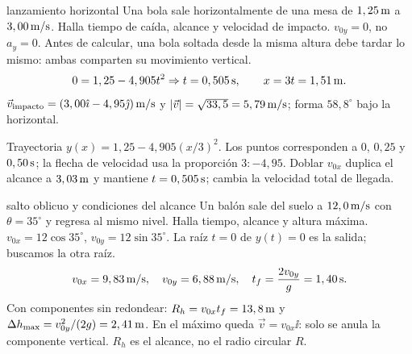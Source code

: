 \documentclass[11pt,a4paper]{article}
\begin{document}
\begin{examplebox}{lanzamiento horizontal}
 Una bola sale horizontalmente de una mesa de
$1,25\,\mathrm{m}$ a $3,00\,\mathrm{m/s}$. Halla tiempo de ca\'ida, alcance y velocidad de impacto.
\solutionblock
{} $v_{0y}=0$, no $a_y=0$. Antes de calcular, una bola soltada desde
la misma altura debe tardar lo mismo: ambas comparten su movimiento vertical.
\[
0=1,25-4,905t^2\Rightarrow t=0,505\,\mathrm{s},\qquad
x=3t=1,51\,\mathrm{m}.
\]
$\vec v_{\mathrm{impacto}}=(3,00\hat{\imath}-4,95\hat{\jmath})\,\mathrm{m/s}$ y
$|\vec v|=\sqrt{33,5}=5,79\,\mathrm{m/s}$; forma $58,8^\circ$ bajo la horizontal.
\begin{center}
\end{center}
Trayectoria $y(x)=1,25-4,905(x/3)^2$. Los puntos corresponden a $0$, $0,25$ y
$0,50\,\mathrm{s}$; la flecha de velocidad usa la proporci\'on $3:-4,95$.
 Doblar $v_{0x}$ duplica el alcance a $3,03\,\mathrm{m}$
y mantiene $t=0,505\,\mathrm{s}$; cambia la velocidad total de llegada.
\end{examplebox}

\begin{examplebox}{salto oblicuo y condiciones del alcance}
 Un bal\'on sale del suelo a $12,0\,\mathrm{m/s}$ con
$\theta=35^\circ$ y regresa al mismo nivel. Halla tiempo, alcance y altura m\'axima.
\solutionblock
{} $v_{0x}=12\cos35^\circ$, $v_{0y}=12\sin35^\circ$.
La ra\'iz $t=0$ de $y(t)=0$ es la salida; buscamos la otra ra\'iz.
\[
v_{0x}=9,83\,\mathrm{m/s},\quad v_{0y}=6,88\,\mathrm{m/s},\quad
t_f=\frac{2v_{0y}}g=1,40\,\mathrm{s}.
\]
Con componentes sin redondear:
$R_h=v_{0x}t_f=13,8\,\mathrm{m}$ y
$\Delta h_{\max}=v_{0y}^2/(2g)=2,41\,\mathrm{m}$.
 En el m\'aximo queda $\vec v=v_{0x}\ii$:
solo se anula la componente vertical. $R_h$ es el alcance, no el radio circular $R$.
\end{examplebox}
\end{document}

